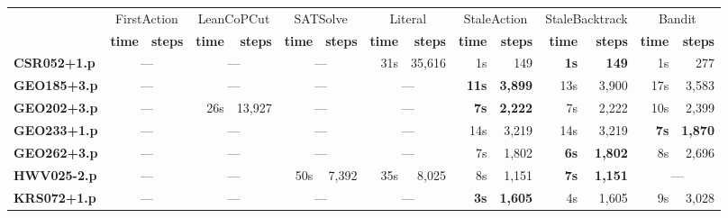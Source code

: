 \documentclass[11pt,twocolumn]{article}
\newcommand{\atom}[1]{\colorbox{Gray!30}{\ttfamily #1}}
\newcommand{\winner}[1]{{\bfseries\color{ForestGreen}#1}}
\begin{document}
% 
% 
\setlength{\defaultaddspace}{4pt}

\begin{table}[t]
	\centering
	\scriptsize
	\begin{tabular}{>{\ttfamily\bfseries}l *{7}{rr}}
		\toprule
		\multirow{2}{*}{{\rmfamily\bfseries Problem}}
			& \multicolumn{2}{c}{\atom{FirstAction}}
			& \multicolumn{2}{c}{\atom{LeanCoPCut}}
			& \multicolumn{2}{c}{\atom{SATSolve}}
			& \multicolumn{2}{c}{\atom{Literal}}
			& \multicolumn{2}{c}{\atom{StaleAction}}
			& \multicolumn{2}{c}{\atom{StaleBacktrack}}
			& \multicolumn{2}{c}{\atom{Bandit}} \\
		& {\bfseries time} & {\bfseries steps}
		& {\bfseries time} & {\bfseries steps}
		& {\bfseries time} & {\bfseries steps}
		& {\bfseries time} & {\bfseries steps}
		& {\bfseries time} & {\bfseries steps}
		& {\bfseries time} & {\bfseries steps}
		& {\bfseries time} & {\bfseries steps} \\
		\midrule
			CSR052+1.p & \multicolumn{2}{c}{---} & \multicolumn{2}{c}{---} & \multicolumn{2}{c}{---} & 31s & 35,616 & 1s & 149 & \winner{1s} & \winner{149} & 1s & 277 \\
			GEO185+3.p & \multicolumn{2}{c}{---} & \multicolumn{2}{c}{---} & \multicolumn{2}{c}{---} & \multicolumn{2}{c}{---} & \winner{11s} & \winner{3,899} & 13s & 3,900 & 17s & 3,583 \\
			GEO202+3.p & \multicolumn{2}{c}{---} & 26s & 13,927 & \multicolumn{2}{c}{---} & \multicolumn{2}{c}{---} & \winner{7s} & \winner{2,222} & 7s & 2,222 & 10s & 2,399 \\
			GEO233+1.p & \multicolumn{2}{c}{---} & \multicolumn{2}{c}{---} & \multicolumn{2}{c}{---} & \multicolumn{2}{c}{---} & 14s & 3,219 & 14s & 3,219 & \winner{7s} & \winner{1,870} \\
			GEO262+3.p & \multicolumn{2}{c}{---} & \multicolumn{2}{c}{---} & \multicolumn{2}{c}{---} & \multicolumn{2}{c}{---} & 7s & 1,802 & \winner{6s} & \winner{1,802} & 8s & 2,696 \\
			\addlinespace
			HWV025-2.p & \multicolumn{2}{c}{---} & \multicolumn{2}{c}{---} & 50s & 7,392 & 35s & 8,025 & 8s & 1,151 & \winner{7s} & \winner{1,151} & \multicolumn{2}{c}{---} \\
			\addlinespace
			KRS072+1.p & \multicolumn{2}{c}{---} & \multicolumn{2}{c}{---} & \multicolumn{2}{c}{---} & \multicolumn{2}{c}{---} & \winner{3s} & \winner{1,605} & 4s & 1,605 & 9s & 3,028 \\

\end{tabular}
\end{table}
\end{document}
